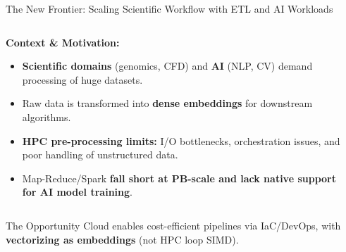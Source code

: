 \documentclass[aspectratio=169]{beamer}
\begin{document}
\begin{frame}{The New Frontier: Scaling Scientific Workflow with ETL and AI Workloads}
    \begin{columns}
        \begin{column}{0.8\textwidth}
            \textbf{Context \& Motivation:}
            \begin{itemize}
                \item \textbf{Scientific domains} (genomics, CFD) and \textbf{AI} (NLP, CV) demand processing of huge datasets.  
                \item Raw data is transformed into \textcolor{rayblue}{\textbf{dense embeddings}} for downstream algorithms.  
                \item \textbf{HPC pre-processing limits:} I/O bottlenecks, orchestration issues, and poor handling of unstructured data.  
                \item Map-Reduce/Spark \textbf{fall short at PB-scale and lack native support for AI model training}.  
            \end{itemize}
            
        \end{column}
        \begin{column}{0.2\textwidth}
        \end{column}
    \end{columns}
    
    \vspace{0.3cm}
        \begin{block}{The Opportunity}
        Cloud enables cost-efficient pipelines via IaC/DevOps, with \textbf{vectorizing as embeddings} (not HPC loop SIMD).  
        \end{block}
\end{frame}
\end{document}
